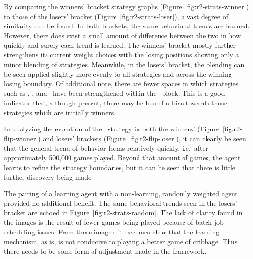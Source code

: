 By comparing the winners' bracket strategy graphs
(Figure~\ref{fig:r2-strats-winner})
to those of the losers' bracket
(Figure~\ref{fig:r2-strats-loser}),
a vast degree of similarity can be found.
%
In both brackets,
the same behavioral trends are learned.
%
However,
there does exist a small amount of difference between the two
in how quickly and surely each trend is learned.
%
The winners' bracket mostly further strengthens its current weight choices
with the losing positions showing only a minor blending of strategies.
%
Meanwhile,
in the losers' bracket,
the blending can be seen applied slightly more evenly to all strategies
and
across the winning-losing boundary.
%
Of additional note,
there are fewer spaces in which
strategies such as \cribminavg, \peggingmaxavggained, and \peggingminavggiven\ 
have been strengthened within the \handmaxmin\ block.
%
This is a good indicator that,
although present,
there may be less of a bias towards those strategies which are initially winners.


In analyzing the evolution of the \handmaxavg\ strategy in both the winners'
(Figure~\ref{fig:r2-flip-winner})
and losers' brackets (Figure~\ref{fig:r2-flip-loser}),
it can clearly be seen that the general trend of behavior forms
relatively quickly,
i.e.\  after approximately 500,000 games played.
%
Beyond that amount of games,
the agent learns to refine the strategy boundaries,
but it can be seen that there is little further discovery being made.








The pairing of a learning agent with a non-learning, randomly weighted agent
provided no additional benefit.
%
The same behavioral trends seen in the losers' bracket are echoed
in Figure~\ref{fig:r2-strats-random}.
%
The lack of clarity found in the images is the result of
fewer games being played because of batch job scheduling issues.
%
From these images,
it becomes clear that the learning mechanism,
as is,
is not conducive to playing a better game of cribbage.
%
Thus there needs to be some form of adjustment made in the framework.







